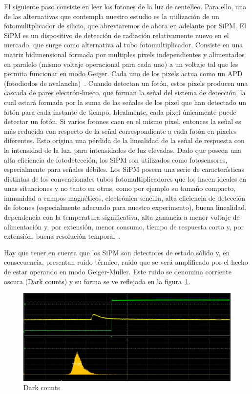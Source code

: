 El siguiente paso consiste en leer los fotones de la luz de centelleo. Para ello, una de las alternativas que contempla nuestro estudio es la utilización de un fotomulitplicador de silicio, que abreviaremos de ahora en adelante  por SiPM. El SiPM es un dispositivo de detección de radiación relativamente nuevo en el mercado, que surge como alternativa al tubo fotomultiplicador. Consiste en una matriz bidimensional formada por multiples pixels independientes y alimentados en paralelo (mismo voltaje operacional para cada uno) a un voltaje tal que les permita funcionar en modo Geiger. Cada uno de los pixels actua como un APD (fotodiodos de avalancha)~\cite{TFMSiPM2}.
Cuando detectan un fotón, estos pixels producen una cascada de pares electrón-hueco, que forman la señal del sistema de detección, la cual estará formada por la suma de las señales de los pixel que han detectado un fotón para cada instante de tiempo. Idealmente, cada pixel únicamente puede detectar un fotón. Si varios fotones caen en el mismo pixel, entonces la señal es más reducida  con respecto de la señal correspondiente a cada fotón en pixeles diferentes.  Esto origina una pérdida de la linealidad de la señal de respuesta con la intensidad de la luz, para intensidades de luz elevadas. Dado que  poseen una alta eficiencia de fotodetección, los SiPM son utilizados como fotosensores, especialmente para señales débiles.
 Los SiPM  poseen una serie de características distintas de los convencionales tubos fotomultiplicadores que los hacen ideales en unas situaciones y no tanto en otras, como por ejemplo su tamaño compacto, inmunidad a campos magnéticos, electrónica sencilla, alta eficiencia de detección de fotones (especialmente adecuado para nuestro experimento), buena linealidad, dependencia con la temperatura significativa, alta ganancia a menor voltaje de alimentación y, por extensión, menor consumo, tiempo de respuesta corto y, por extensión, buena resolución temporal~\cite{AMFNP}.

Hay que tener en cuenta que los SiPM son detectores de estado sólido y, en consecuencia, presentan ruido térmico, ruido que se verá amplificado por el hecho de estar operando en modo Geiger-Muller. Este ruido se denomina corriente oscura (Dark counts) y su forma se ve reflejada en la  figura~\ref{Darkcounts}.

\begin{figure}[hbtp]
\centering
\includegraphics[scale=0.2]{pedestal.png}
\caption{Dark counts\label{Darkcounts}}
\end{figure}

